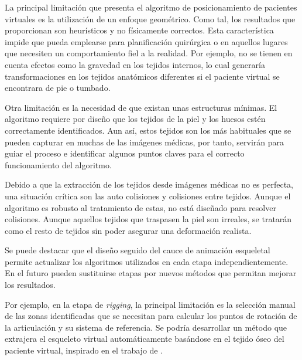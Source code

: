 La principal limitación que presenta el algoritmo de posicionamiento de pacientes virtuales es la utilización de un enfoque geométrico. Como tal, los resultados que proporcionan son heurísticos y no físicamente correctos. Esta característica impide que pueda emplearse para planificación quirúrgica o en aquellos lugares que necesiten un comportamiento fiel a la realidad. Por ejemplo, no se tienen en cuenta efectos como la gravedad en los tejidos internos, lo cual generaría transformaciones en los tejidos anatómicos diferentes si el paciente virtual se encontrara de pie o tumbado. 

Otra limitación es la necesidad de que existan unas estructuras mínimas. El algoritmo requiere por diseño que los tejidos de la piel y los huesos estén correctamente identificados. Aun así, estos tejidos son los más habituales que se pueden capturar en muchas de las imágenes médicas, por tanto, servirán para guiar el proceso e identificar algunos puntos claves para el correcto funcionamiento del algoritmo.
    
Debido a que la extracción de los tejidos desde imágenes médicas no es perfecta, una situación crítica son las auto colisiones y colisiones entre tejidos. Aunque el algoritmo es robusto al tratamiento de estas, no está diseñado para resolver colisiones. Aunque aquellos tejidos que traspasen la piel son irreales, se tratarán como el resto de tejidos sin poder asegurar una deformación realista.
    



Se puede destacar que el diseño seguido del cauce de animación esqueletal permite actualizar los algoritmos utilizados en cada etapa independientemente. En el futuro pueden sustituirse etapas por nuevos métodos que permitan mejorar los resultados. 

Por ejemplo, en la etapa de \emph{rigging}, la principal limitación es la selección manual de las zonas identificadas que se necesitan para calcular los puntos de rotación de la articulación y su sistema de referencia. Se podría desarrollar un método que extrajera el esqueleto virtual automáticamente basándose en el tejido óseo del paciente virtual, inspirado en el trabajo de \cite{Tagliasacchi}.

